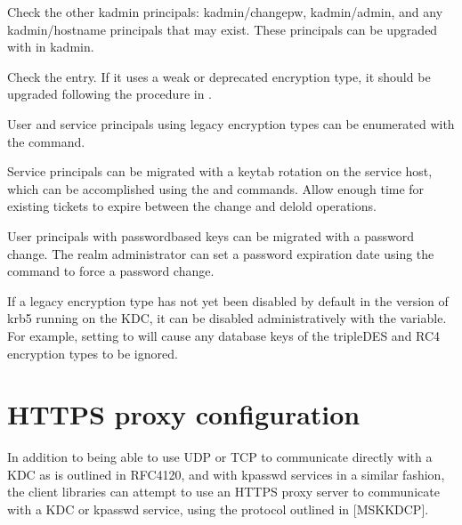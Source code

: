 \documentclass[letterpaper,10pt,english]{sphinxmanual}
\begin{document}
\sphinxAtStartPar
Check the other kadmin principals: kadmin/changepw, kadmin/admin, and
any kadmin/hostname principals that may exist.  These principals can
be upgraded with  in kadmin.

\sphinxAtStartPar
Check the  entry.  If it uses a weak or deprecated encryption
type, it should be upgraded following the procedure in
{\hyperref[\detokenize{admin/database:updating-master-key}]{}}.

\sphinxAtStartPar
User and service principals using legacy encryption types can be
enumerated with the {\hyperref[\detokenize{admin/admin_commands/kdb5_util:kdb5-util-8}]{}}  command.

\sphinxAtStartPar
Service principals can be migrated with a keytab rotation on the
service host, which can be accomplished using the {\hyperref[\detokenize{admin/admin_commands/k5srvutil:k5srvutil-1}]{}}
 and  commands.  Allow enough time for existing
tickets to expire between the change and delold operations.

\sphinxAtStartPar
User principals with password\sphinxhyphen{}based keys can be migrated with a
password change.  The realm administrator can set a password
expiration date using the {\hyperref[\detokenize{admin/admin_commands/kadmin_local:kadmin-1}]{}}  command to force a password change.

\sphinxAtStartPar
If a legacy encryption type has not yet been disabled by default in
the version of krb5 running on the KDC, it can be disabled
administratively with the  variable.  For
example, setting  to  will
cause any database keys of the triple\sphinxhyphen{}DES and RC4 encryption types to
be ignored.

\sphinxstepscope


\chapter{HTTPS proxy configuration}
\label{\detokenize{admin/https:https-proxy-configuration}}\label{\detokenize{admin/https:https}}\label{\detokenize{admin/https::doc}}
\sphinxAtStartPar
In addition to being able to use UDP or TCP to communicate directly
with a KDC as is outlined in RFC4120, and with kpasswd services in a
similar fashion, the client libraries can attempt to use an HTTPS
proxy server to communicate with a KDC or kpasswd service, using the
protocol outlined in {[}MS\sphinxhyphen{}KKDCP{]}.
\end{document}
